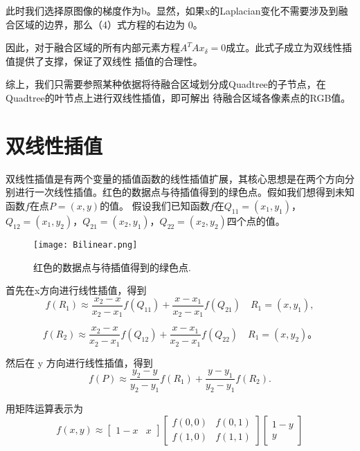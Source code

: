 \documentclass[10pt,twocolumn,letterpaper]{ctexart}
\begin{document}
   此时我们选择原图像的梯度作为b。显然，如果x的Laplacian变化不需要涉及到融合区域的边界，那么（4）式方程的右边为
   0。

   因此，对于融合区域的所有内部元素方程$ A^{T}Ax_\delta = 0$成立。此式子成立为双线性插值提供了支撑，保证了双线性
   插值的合理性。

   综上，我们只需要参照某种依据将待融合区域划分成Quadtree的子节点，在Quadtree的叶节点上进行双线性插值，即可解出
   待融合区域各像素点的RGB值。
\section{双线性插值}
   双线性插值是有两个变量的插值函数的线性插值扩展，其核心思想是在两个方向分别进行一次线性插值。红色的数据点与待插值得到的绿色点。假如我们想得到未知函数{$\displaystyle f$}在点{$\displaystyle P=\left(x,y\right)$}的值。
   假设我们已知函数{$\displaystyle f$}在{$\displaystyle Q_{11}=\left(x_1,y_1\right)$}，{$\displaystyle Q_{12}=\left(x_1,y_2\right)$}，{$\displaystyle Q_{21}=\left(x_2,y_1\right)$}，{$\displaystyle Q_{22}=\left(x_2,y_2\right)$}四个点的值。

   \begin{figure}[t]
   \begin{center}
      \texttt{[image: Bilinear.png]}
   \end{center}
      \caption{红色的数据点与待插值得到的绿色点.}
   \label{fig:long}
   \label{fig:onecol}
   \end{figure}

   首先在x方向进行线性插值，得到
   \begin{equation}
   {\displaystyle f(R_{1})\approx {\frac {x_{2}-x}{x_{2}-x_{1}}}f(Q_{11})+{\frac {x-x_{1}}{x_{2}-x_{1}}}f(Q_{21})\quad R_{1}=(x,y_{1}),}
   \end{equation}

   \begin{equation}
   {\displaystyle f(R_{2})\approx {\frac {x_{2}-x}{x_{2}-x_{1}}}f(Q_{12})+{\frac {x-x_{1}}{x_{2}-x_{1}}}f(Q_{22})\quad R_{1}=(x,y_{2})。}
   \end{equation}

   然后在 y 方向进行线性插值，得到
   \begin{equation}
   {\displaystyle f(P)\approx {\frac {y_{2}-y}{y_{2}-y_{1}}}f(R_{1})+{\frac {y-y_{1}}{y_{2}-y_{1}}}f(R_{2}).}
   \end{equation}

   用矩阵运算表示为
   \begin{equation}
   {\displaystyle f(x,y)\approx {\begin{bmatrix}1-x&x\end{bmatrix}}{\begin{bmatrix}f(0,0)&f(0,1)\\f(1,0)&f(1,1)\end{bmatrix}}{\begin{bmatrix}1-y\\y\end{bmatrix}}}
   \end{equation}
\end{document}
